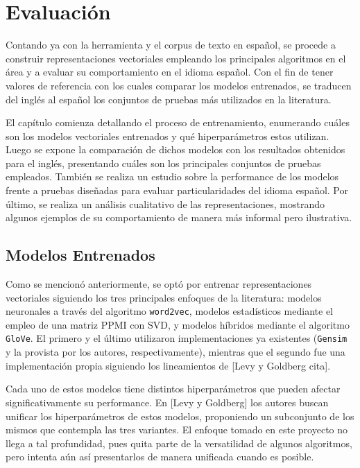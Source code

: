 \chapter{Evaluación}

Contando ya con la herramienta y el corpus de texto en español, se procede a construir
representaciones vectoriales empleando los principales algoritmos en el área y a evaluar su
comportamiento en el idioma español. Con el fin de tener valores de referencia con los cuales
comparar los modelos entrenados, se traducen del inglés al español los conjuntos de pruebas más
utilizados en la literatura.

El capítulo comienza detallando el proceso de entrenamiento, enumerando cuáles son los modelos
vectoriales entrenados y qué hiperparámetros estos utilizan. Luego se expone la comparación de
dichos modelos con los resultados obtenidos para el inglés, presentando cuáles son los principales
conjuntos de pruebas empleados. También se realiza un estudio sobre la performance de los modelos
frente a pruebas diseñadas para evaluar particularidades del idioma español. Por último, se realiza
un análisis cualitativo de las representaciones, mostrando algunos ejemplos de su comportamiento de
manera más informal pero ilustrativa.


\section{Modelos Entrenados}

Como se mencionó anteriormente, se optó por entrenar representaciones vectoriales siguiendo los tres
principales enfoques de la literatura: modelos neuronales a través del algoritmo \texttt{word2vec},
modelos estadísticos mediante el empleo de una matriz PPMI con SVD, y modelos híbridos mediante el
algoritmo \texttt{GloVe}. El primero y el último utilizaron implementaciones ya existentes
(\texttt{Gensim} y la provista por los autores, respectivamente), mientras que el segundo fue una
implementación propia siguiendo los lineamientos de [Levy y Goldberg cita].

Cada uno de estos modelos tiene distintos hiperparámetros que pueden afectar significativamente su
performance. En [Levy y Goldberg] los autores buscan unificar los hiperparámetros de estos modelos,
proponiendo un subconjunto de los mismos que contempla las tres variantes. El enfoque tomado en este
proyecto no llega a tal profundidad, pues quita parte de la versatilidad de algunos algoritmos, pero
intenta aún así presentarlos de manera unificada cuando es posible.

